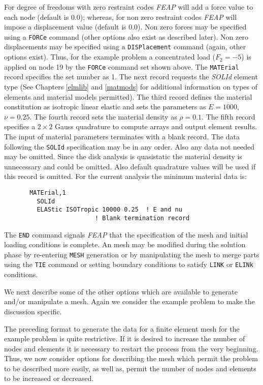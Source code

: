 For degree of freedoms with zero restraint codes {\sl FEAP} will add a force
value to each node (default is 0.0);
whereas, for non zero restraint codes {\sl FEAP} will
impose a displacement value (default is 0.0).  Non zero forces may
be specified using a {\tt FORCe} command (other options also exist
as described later).  Non zero displacements may be specified using
a {\tt DISPlacement} command (again, other options exist).
Thus, for the example problem
a concentrated load ($F_2 = -5$) is applied on node 19 by the {\tt FORCe}
command set shown above.
The {\tt MATErial} record specifies the set number as 1.  The
next record requests the {\it SOLId} element type (See Chapters \ref{elmlib}
and \ref{matmods} for
additional information on types of elements and material models permitted).
The third record defines the material constitution as isotropic linear
elastic and sets the parameters
as $E = 1000$, $\nu = 0.25$.
The fourth record sets the material density as $\rho = 0.1$.
The fifth record specifies a $2 \times 2$ Gauss quadrature
to compute arrays and output element results.
The input of material parameters terminates with a blank record.  The data
following the {\tt SOLId} specification may be in any order.  Also any data
not needed may be omitted.  Since the disk analysis is quasistatic the
material density is unnecessary and could be omitted.  Also default quadrature
values will be used if this record is omitted.  For the current analysis the
minimum material data is:
\begin{verbatim}
       MATErial,1
         SOLId
         ELAStic ISOTropic 10000 0.25  ! E and nu
                         ! Blank termination record
\end{verbatim}

The {\tt END}
command signals {\sl FEAP} that the specification of the mesh and initial
loading conditions is complete.  An mesh may be modified during
the solution phase by re-entering {\tt MESH} generation or by manipulating
the mesh to merge parts using the {\tt TIE} command
or setting boundary conditions to satisfy {\tt LINK} or {\tt ELINk} conditions.
\vskip 0.2in

We next describe some of the other options which are available
to generate and/or manipulate a mesh.
Again we consider the example problem to make the discussion specific.

The preceding format to generate the data for a finite element
mesh for the example problem is quite
restrictive.  If it is desired to increase the number of nodes and
elements it is necessary to restart the process from the very beginning.
Thus, we now consider options for describing the mesh which permit the
problem to be described more easily, as well as, permit the number of
nodes and elements to be increased or decreased.

